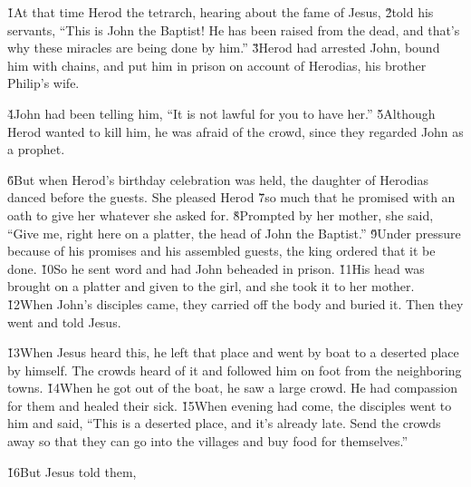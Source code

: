 \v{1}At that time Herod the tetrarch, hearing about the fame of Jesus, \v{2}told his servants, ``This is John the Baptist! He has been raised from the dead, and that's why these miracles are being done by him.'' \v{3}Herod had arrested John, bound him with chains, and put him in prison on account of Herodias, his brother Philip's wife.

\v{4}John had been telling him, ``It is not lawful for you to have her.'' \v{5}Although Herod wanted to kill him, he was afraid of the crowd, since they regarded John as a prophet.

\v{6}But when Herod's birthday celebration was held, the daughter of Herodias danced before the guests. She pleased Herod \v{7}so much that he promised with an oath to give her whatever she asked for. \v{8}Prompted by her mother, she said, ``Give me, right here on a platter, the head of John the Baptist.'' \v{9}Under pressure because of his promises and his assembled guests, the king ordered that it be done. \v{10}So he sent word and had John beheaded in prison. \v{11}His head was brought on a platter and given to the girl, and she took it to her mother. \v{12}When John's disciples came, they carried off the body and buried it. Then they went and told Jesus.

\v{13}When Jesus heard this, he left that place and went by boat to a deserted place by himself. The crowds heard of it and followed him on foot from the neighboring towns. \v{14}When he got out of the boat, he saw a large crowd. He had compassion for them and healed their sick. \v{15}When evening had come, the disciples went to him and said, ``This is a deserted place, and it's already late. Send the crowds away so that they can go into the villages and buy food for themselves.''

\v{16}But Jesus told them, 

